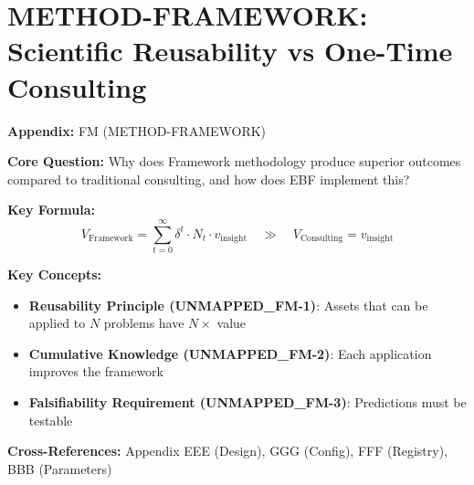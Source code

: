 \chapter{METHOD-FRAMEWORK: Scientific Reusability vs One-Time Consulting}
\label{app:method-framework}


\begin{tcolorbox}[colback=blue!5!white, colframe=blue!75!black,
    title=Quick Reference: Appendix UNMAPPED_FM]

\textbf{Appendix:} FM (METHOD-FRAMEWORK)

\textbf{Core Question:} Why does Framework methodology produce superior outcomes compared to traditional consulting, and how does EBF implement this?

\textbf{Key Formula:}
\begin{equation}
V_{\text{Framework}} = \sum_{t=0}^{\infty} \delta^t \cdot N_t \cdot v_{\text{insight}} \quad \gg \quad V_{\text{Consulting}} = v_{\text{insight}}
\label{eq:fm-value}
\end{equation}

\textbf{Key Concepts:}
\begin{itemize}[nosep]
\item \textbf{Reusability Principle (UNMAPPED_FM-1)}: Assets that can be applied to $N$ problems have $N \times$ value
\item \textbf{Cumulative Knowledge (UNMAPPED_FM-2)}: Each application improves the framework
\item \textbf{Falsifiability Requirement (UNMAPPED_FM-3)}: Predictions must be testable
\end{itemize}

\textbf{Cross-References:} Appendix EEE (Design), GGG (Config), FFF (Registry), BBB (Parameters)
\end{tcolorbox}

\begin{abstract}
This appendix addresses a fundamental methodological question: Why do 80\% of consulting insights disappear after implementation, while scientific knowledge accumulates over centuries? We identify five principles that distinguish Framework methodology from traditional consulting: (1) Reusability, (2) Transparency, (3) Cumulative Growth, (4) Falsifiability, and (5) Transferability. We show how EBF implements these principles through its 10C architecture, model registry, and parameter database, creating a self-improving system where each client engagement strengthens the overall framework.
\end{abstract}


